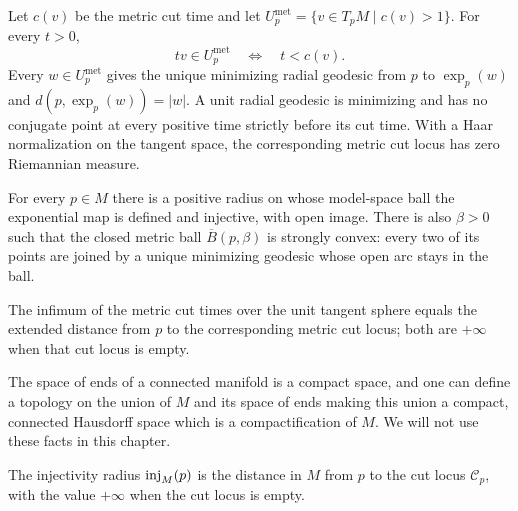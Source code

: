 \begin{lemma}
\label{lem:metric-segment-domain-radial}


Let $c(v)$ be the metric cut time and let
$U_p^{\mathrm{met}}=\{v\in T_pM\mid c(v)>1\}$.  For every $t>0$,
$$tv\in U_p^{\mathrm{met}}\quad\Longleftrightarrow\quad t<c(v).$$
Every $w\in U_p^{\mathrm{met}}$ gives the unique minimizing radial geodesic
from $p$ to $\exp_p(w)$ and $d(p,\exp_p(w))=|w|$.  A unit radial geodesic is
minimizing and has no conjugate point at every positive time strictly before
its cut time.  With a Haar normalization on the tangent space, the
corresponding metric cut locus has zero Riemannian measure.
\end{lemma}

\begin{lemma}
\label{lem:pointwise-strongly-convex-normal-ball}


For every $p\in M$ there is a positive radius on whose model-space
ball the exponential map is defined and injective, with open image.
There is also $\beta>0$ such that the closed metric ball
$\overline B(p,\beta)$ is strongly convex: every two of its points
are joined by a unique minimizing geodesic whose open arc stays in
the ball.
\end{lemma}

\begin{remark}
\label{rem:cut-time-injectivity-radius-distance}


The infimum of the metric cut times over the unit tangent sphere equals the
extended distance from $p$ to the corresponding metric cut locus; both are
$+\infty$ when that cut locus is empty.
\end{remark}

\begin{remark}
\label{rem:ends-compactification}
The space of ends of a connected manifold is a compact space, and
one can define a topology on the union of $M$ and its space of ends
making this union a compact, connected Hausdorff space which is a
compactification of $M$. We will not use these facts in this
chapter.
\end{remark}

\begin{remark}
\label{rem:injectivity-radius-distance}


The injectivity radius $\operatorname{inj}_M(p)$ is the distance in $M$ from $p$ to
the cut locus ${\mathcal C}_p$, with the value $+\infty$ when the cut locus is empty.
\end{remark}

